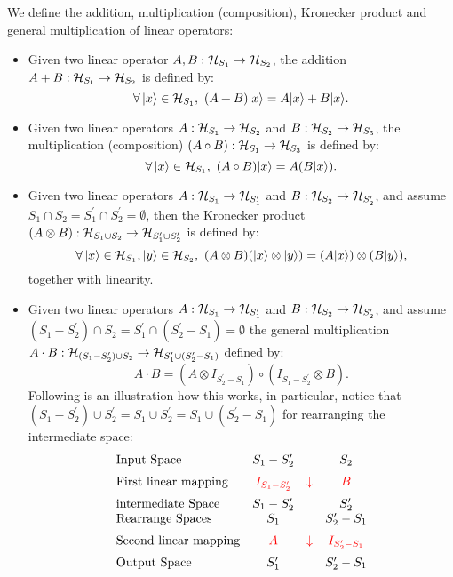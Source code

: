     \begin{definition}
        We define the addition, multiplication (composition), Kronecker product and general multiplication of linear operators:
        \begin{itemize}
            \item Given two linear operator $A,B:{\mathcal{H}}_{S_1}\rightarrow{\mathcal{H}}_{S_2}$, the addition $A+B:{\mathcal{H}}_{S_1}\rightarrow{\mathcal{H}}_{S_2}$ is defined by:
            $$\forall\,|x\>\in\cH_{S_1},\ (A+B)|x\> = A|x\>+B|x\>.$$
            \item Given two linear operators $A:{\mathcal{H}}_{S_1}\rightarrow{\mathcal{H}}_{S_2}$ and $B:{\mathcal{H}}_{S_2}\rightarrow{\mathcal{H}}_{S_3}$, the multiplication (composition) $(A\circ B):{\mathcal{H}}_{S_1}\rightarrow{\mathcal{H}}_{S_3}$ is defined by:
            $$\forall\,|x\rangle\in{\mathcal{H}}_{S_1},\ (A\circ B)|x\rangle = A(B|x\rangle).$$
            \item Given two linear operators $A:{\mathcal{H}}_{S_1}\rightarrow{\mathcal{H}}_{S_1^\prime}$ and $B:{\mathcal{H}}_{S_2}\rightarrow{\mathcal{H}}_{S_2^\prime}$, and assume $S_1\cap S_2 = S_1^\prime\cap S_2^\prime = \emptyset$, then the Kronecker product $(A\otimes B):{\mathcal{H}}_{S_1\cup S_2}\rightarrow{\mathcal{H}}_{S_1^\prime\cup S_2^\prime}$ is defined by:
            $$\forall\,|x\>\in\cH_{S_1},|y\>\in\cH_{S_2},\ (A\otimes B)(|x\>\otimes|y\>) = (A|x\>)\otimes(B|y\>),$$
            together with linearity.
            \item Given two linear operators $A:{\mathcal{H}}_{S_1}\rightarrow{\mathcal{H}}_{S_1^\prime}$ and $B:{\mathcal{H}}_{S_2}\rightarrow{\mathcal{H}}_{S_2^\prime}$, and assume $(S_1-S_2^\prime)\cap S_2 = S_1^\prime\cap(S_2^\prime-S_1) = \emptyset$ the general multiplication $A\cdot B: {\mathcal{H}}_{(S_1-S_2^\prime)\cup S_2}\rightarrow{\mathcal{H}}_{S_1^\prime\cup(S_2^\prime-S_1)}$ defined by:
            $$A\cdot B = (A\otimes I_{S_2^\prime-S_1})\circ(I_{S_1-S_2^\prime}\otimes B).$$
            Following is an illustration how this works, in particular, notice that $(S_1-S_2^\prime)\cup S_2^\prime = S_1\cup S_2^\prime = S_1\cup(S_2^\prime-S_1)$ for rearranging the intermediate space:
            \begin{align*}
                \begin{array}{lccc}
                    \text{Input Space} & S_1-S_2^\prime &  & S_2 \\[0.2cm]
                    \text{First linear mapping} & {\color{red}I_{S_1-S_2^\prime}} & {\color{red}\downarrow} & {\color{red}B}  \\[0.2cm]
                    \text{intermediate Space}& S_1-S_2^\prime &  & S_2^\prime  \\
                    \text{Rearrange Spaces}& S_1 &  & S_2^\prime-S_1  \\[0.2cm]
                    \text{Second linear mapping}& {\color{red}A} & {\color{red}\downarrow} & {\color{red}I_{S_2^\prime-S_1}} \\[0.2cm]
                    \text{Output Space}& S_1^\prime & & S_2^\prime-S_1
                \end{array}
            \end{align*}
        \end{itemize}
    \end{definition}
    

